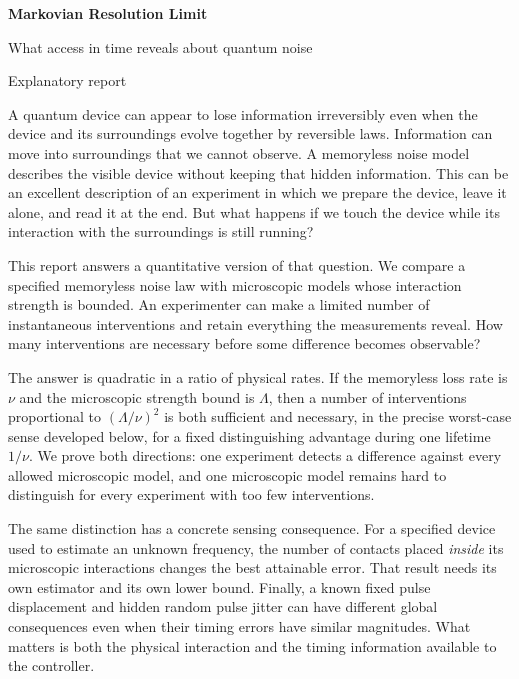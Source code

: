 \documentclass[11pt,a4paper]{article}
\numberwithin{equation}{section}
\theoremstyle{remark}
\begin{document}
\begin{center}
{\color{ink}\LARGE\bfseries Markovian Resolution Limit\par}
\vspace{0.45em}
{\large What access in time reveals about quantum noise\par}
\vspace{0.65em}
{\small Explanatory report\par}
\end{center}
\vspace{0.4em}

A quantum device can appear to lose information irreversibly even when the
device and its surroundings evolve together by reversible laws. Information
can move into surroundings that we cannot observe. A memoryless noise model
describes the visible device without keeping that hidden information.
This can be an excellent description of an experiment in which we prepare
the device, leave it alone, and read it at the end. But what happens if we
touch the device while its interaction with the surroundings is still running?

This report answers a quantitative version of that question. We compare a
specified memoryless noise law with microscopic models whose interaction
strength is bounded. An experimenter can make a limited number of instantaneous
interventions and retain everything the measurements reveal. How many
interventions are necessary before some difference becomes observable?

The answer is quadratic in a ratio of physical rates. If the memoryless loss
rate is $\nu$ and the microscopic strength bound is $\Lambda$, then a number
of interventions proportional to $(\Lambda/\nu)^2$ is both sufficient and
necessary, in the precise worst-case sense developed below, for a fixed
distinguishing advantage during one lifetime $1/\nu$. We prove both
directions: one experiment detects a difference against every allowed
microscopic model, and one microscopic model remains hard to distinguish
for every experiment with too few interventions.

The same distinction has a concrete sensing consequence. For a specified
device used to estimate an unknown frequency, the number of contacts placed
\emph{inside} its microscopic interactions changes the best attainable error.
That result needs its own estimator and its own lower bound. Finally, a
known fixed pulse displacement and hidden random pulse jitter can have
different global consequences even when their timing errors have similar
magnitudes. What matters is both the physical interaction and the timing
information available to the controller.
\end{document}
